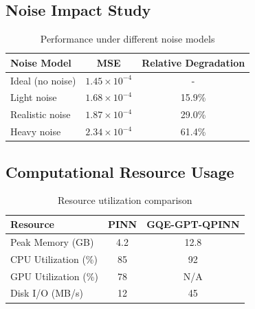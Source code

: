 \documentclass[11pt,a4paper,uplatex,dvipdfmx]{jsarticle}
\begin{document}
\subsection{Noise Impact Study}

\begin{table}[h]
\centering
\caption{Performance under different noise models}
\begin{tabular}{lcc}
\toprule
Noise Model & MSE & Relative Degradation \\
\midrule
Ideal (no noise) & $1.45 \times 10^{-4}$ & - \\
Light noise & $1.68 \times 10^{-4}$ & 15.9\% \\
Realistic noise & $1.87 \times 10^{-4}$ & 29.0\% \\
Heavy noise & $2.34 \times 10^{-4}$ & 61.4\% \\
\bottomrule
\end{tabular}
\end{table}

\subsection{Computational Resource Usage}

\begin{table}[h]
\centering
\caption{Resource utilization comparison}
\begin{tabular}{lcc}
\toprule
Resource & PINN & GQE-GPT-QPINN \\
\midrule
Peak Memory (GB) & 4.2 & 12.8 \\
CPU Utilization (\%) & 85 & 92 \\
GPU Utilization (\%) & 78 & N/A \\
Disk I/O (MB/s) & 12 & 45 \\
\bottomrule
\end{tabular}
\end{table}
\end{document}
